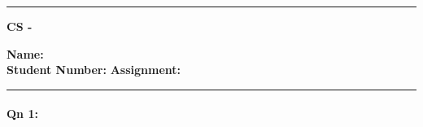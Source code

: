 \documentclass[12pt]{scrartcl}
\begin{document}
\begin{center}
  \hrule
  \vspace{.4cm}
  {\textbf { \large CS - }}
\end{center}
{\textbf{Name:}\  \\
  { \textbf{Student Number:}}  \hspace{\fill} \textbf{Assignment:}  \\
\hrule}

\paragraph*{Qn 1:} %
\end{document}
